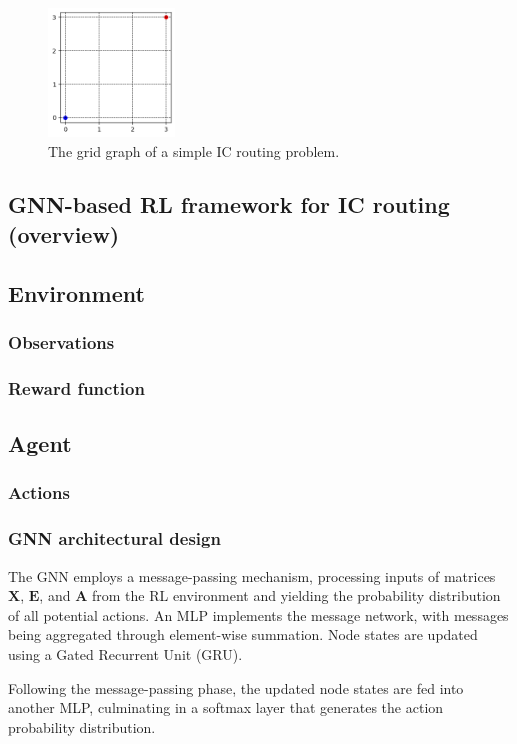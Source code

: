 \documentclass[letterpaper]{article}
\begin{document}
\begin{figure}[h!]
    \centering
    \includegraphics[width=0.3\textwidth]{figure/grid_grap.png}
    \caption{The grid graph of a simple IC routing problem.}
    \label{fig:grid}
\end{figure}

\subsection{GNN-based RL framework for IC routing (overview)}
\subsection{Environment}
\subsubsection{Observations}
\subsubsection{Reward function}
\subsection{Agent}
\subsubsection{Actions}
\subsubsection{GNN architectural design}
The GNN employs a message-passing mechanism, processing inputs of matrices $\mathbf{X}$, $\mathbf{E}$, and $\mathbf{A}$ from the RL environment and yielding the probability distribution of all potential actions. An MLP implements the message network, with messages being aggregated through element-wise summation. Node states are updated using a Gated Recurrent Unit (GRU). 

Following the message-passing phase, the updated node states are fed into another MLP, culminating in a softmax layer that generates the action probability distribution.
\end{document}
